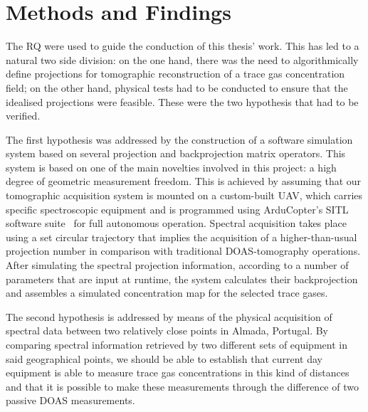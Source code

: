

\section{Methods and Findings}%
\label{sec:intro_methods}

The \acrlong{RQ} were used to guide the conduction of this thesis' work.
This has led to a natural two side division: on the one hand, there was
the need to algorithmically define projections for tomographic
reconstruction of a trace gas concentration field; on the other hand,
physical tests had to be conducted to ensure that the idealised
projections were feasible. These were the two hypothesis that had to be
verified.

The first hypothesis was addressed by the construction of a software
simulation system based on several projection and backprojection matrix
operators. This system is based on one of the main novelties involved in
this project: a high degree of geometric measurement freedom. This is
achieved by assuming that our tomographic acquisition system is mounted
on a custom-built \gls{UAV}, which carries specific spectroscopic
equipment and is programmed using ArduCopter's SITL software
suite~\cite{arducopter} for full autonomous operation. Spectral
acquisition takes place using a set circular trajectory that implies the
acquisition of a higher-than-usual projection number in comparison with
traditional DOAS-tomography operations. After simulating the spectral
projection information, according to a number of parameters that are
input at runtime, the system calculates their backprojection and
assembles a simulated concentration map for the selected trace gases.

The second hypothesis is addressed by means of the physical acquisition
of spectral data between two relatively close points in Almada,
Portugal. By comparing spectral information retrieved by two different
sets of equipment in said geographical points, we should be able to
establish that current day equipment is able to measure trace gas
concentrations in this kind of distances and that it is possible to make
these measurements through the difference of two passive \gls{DOAS}
measurements.
